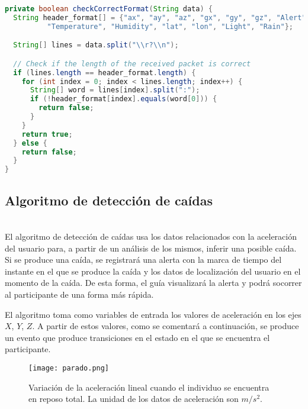 \begin{lstlisting}[language=java,captionpos=t,caption={\textbf{Proceso de comprobación del formato de los datos recibidos por el \textit{socket Bluetooth}.}},label={lst:checkFormat}]
private boolean checkCorrectFormat(String data) {
  String header_format[] = {"ax", "ay", "az", "gx", "gy", "gz", "Alert", "Stop",
          "Temperature", "Humidity", "lat", "lon", "Light", "Rain"};

  String[] lines = data.split("\\r?\\n");

  // Check if the length of the received packet is correct
  if (lines.length == header_format.length) {
    for (int index = 0; index < lines.length; index++) {
      String[] word = lines[index].split(":");
      if (!header_format[index].equals(word[0])) {
        return false;
      }
    }
    return true;
  } else {
    return false;
  }
}
\end{lstlisting}

\subsection{Algoritmo de detección de caídas} 

\\

El algoritmo de detección de caídas usa los datos relacionados con la aceleración del usuario para, a partir de un análisis de los mismos, inferir una posible caída. Si se produce una caída, se registrará una alerta con la marca de tiempo del instante en el que se produce la caída y los datos de localización del usuario en el momento de la caída. De esta forma, el guía visualizará la alerta y podrá socorrer al participante de una forma más rápida.

El algoritmo toma como variables de entrada los valores de aceleración en los ejes $X$, $Y$, $Z$. A partir de estos valores, como se comentará a continuación, se produce un evento que produce transiciones en el estado en el que se encuentra el participante.

\begin{figure}[!h]
\begin{center}
\texttt{[image: parado.png]}
\caption{Variación de la aceleración lineal cuando el individuo se encuentra en reposo total. La unidad de los datos de aceleración son $m/s^2$.}
\label{fig:parado}
\end{center}
\end{figure}

